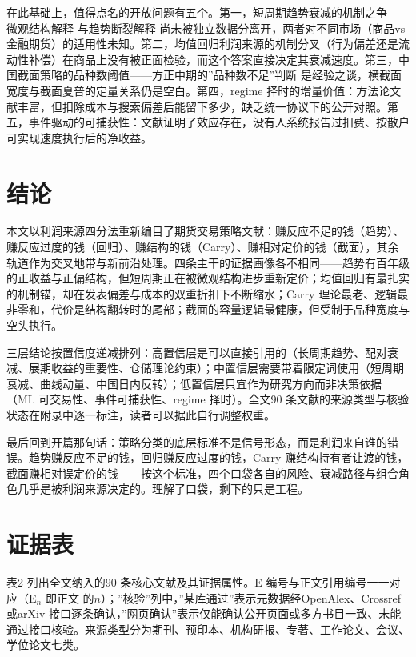 \documentclass[12pt,a4paper]{ctexart}
\begin{document}
在此基础上，值得点名的开放问题有五个。第一，短周期趋势衰减的机制之争——微观结构解释\cite{11} 与趋势断裂解释\cite{10} 尚未被独立数据分离开，两者对不同市场（商品vs 金融期货）的适用性未知。第二，均值回归利润来源的机制分叉（行为偏差还是流动性补偿\cite{29}）在商品上没有被正面检验，而这个答案直接决定其衰减速度。第三，中国截面策略的品种数阈值——方正中期的”\hspace{0.3em}品种数不足”\hspace{0.3em}判断\cite{66} 是经验之谈，横截面宽度与截面夏普的定量关系仍是空白。第四，regime 择时的增量价值：方法论文献丰富\cite{88, 89, 90}，但扣除成本与搜索偏差后能留下多少，缺乏统一协议下的公开对照。第五，事件驱动的可捕获性：文献证明了效应存在\cite{73, 74}，没有人系统报告过扣费、按散户可实现速度执行后的净收益。


\section{结论}

本文以利润来源四分法重新编目了期货交易策略文献：赚反应不足的钱（趋势）、赚反应过度的钱（回归）、赚结构的钱（Carry）、赚相对定价的钱（截面），其余轨道作为交叉地带与新前沿处理。四条主干的证据画像各不相同——趋势有百年级的正收益与正偏结构，但短周期正在被微观结构进步重新定价；均值回归有最扎实的机制锚，却在发表偏差与成本的双重折扣下不断缩水；Carry 理论最老、逻辑最非零和，代价是结构翻转时的尾部；截面的容量逻辑最健康，但受制于品种宽度与空头执行。


三层结论按置信度递减排列：高置信层是可以直接引用的（长周期趋势、配对衰减、展期收益的重要性、仓储理论约束）；中置信层需要带着限定词使用（短周期衰减、曲线动量、中国日内反转）；低置信层只宜作为研究方向而非决策依据（ML 可交易性、事件可捕获性、regime 择时）。全文90 条文献的来源类型与核验状态在附录中逐一标注，读者可以据此自行调整权重。


最后回到开篇那句话：策略分类的底层标准不是信号形态，而是利润来自谁的错误。趋势赚反应不足的钱，回归赚反应过度的钱，Carry 赚结构持有者让渡的钱，截面赚相对误定价的钱——按这个标准，四个口袋各自的风险、衰减路径与组合角色几乎是被利润来源决定的。理解了口袋，剩下的只是工程。


\newpage
\appendix

\section{证据表}

表2 列出全文纳入的90 条核心文献及其证据属性。E 编号与正文引用编号一一对应（E$_n$ 即正文\cite{01} 的$n$）；”\hspace{0.3em}核验”\hspace{0.3em}列中，”\hspace{0.3em}某库通过”\hspace{0.3em}表示元数据经OpenAlex、Crossref 或arXiv 接口逐条确认，”\hspace{0.3em}网页确认”\hspace{0.3em}表示仅能确认公开页面或多方书目一致、未能通过接口核验。来源类型分为期刊、预印本、机构研报、专著、工作论文、会议、学位论文七类。
\end{document}
